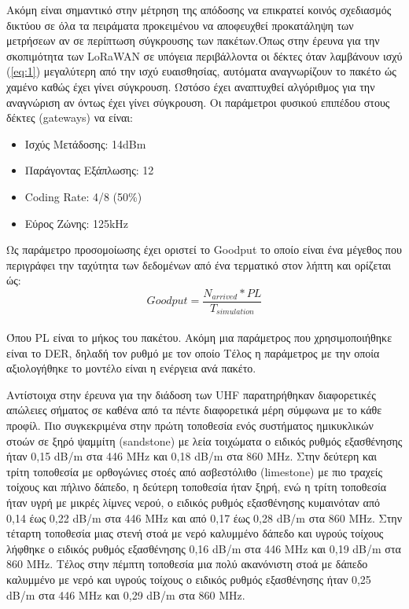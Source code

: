 \documentclass[12pt, greek]{article}
\begin{document}
\begin{multicols*}{2}
        Ακόμη είναι σημαντικό στην μέτρηση της απόδοσης να επικρατεί κοινός
        σχεδιασμός δικτύου σε όλα τα πειράματα προκειμένου να αποφευχθεί προκατάληψη
        των μετρήσεων αν σε περίπτωση σύγκρουσης των πακέτων.Όπως στην έρευνα για την
        σκοπιμότητα των LoRaWAN σε υπόγεια περιβάλλοντα \cite{zhao_feasibility_2023}
        οι δέκτες όταν λαμβάνουν ισχύ (\ref{eq:1}) μεγαλύτερη από την ισχύ ευαισθησίας,
        αυτόματα αναγνωρίζουν το πακέτο ώς χαμένο καθώς έχει γίνει σύγκρουση. Ωστόσο έχει
        αναπτυχθεί αλγόριθμος για την αναγνώριση αν όντως έχει γίνει σύγκρουση.
        Οι παράμετροι φυσικού επιπέδου στους δέκτες (gateways) να είναι:
        \begin{itemize}
            \item Ισχύς Μετάδοσης: 14dBm
            \item Παράγοντας Εξάπλωσης: 12
            \item Coding Rate: 4/8 (50\%)
            \item Εύρος Ζώνης: 125kHz
        \end{itemize}

        Ως παράμετρο προσομοίωσης έχει οριστεί το Goodput το οποίο είναι ένα μέγεθος
        που περιγράφει την ταχύτητα των δεδομένων από ένα τερματικό στον λήπτη και 
        ορίζεται ώς: 
        \begin{equation}\label{eq:2}
            Goodput = \frac{N_{arrived} * PL}{T_{simulation}}
        \end{equation}\\
        Όπου PL είναι το μήκος του πακέτου.
        Ακόμη μια παράμετρος που χρησιμοποιήθηκε είναι το DER, δηλαδή τον ρυθμό με τον οποίο 
        Τέλος η παράμετρος με την οποία αξιολογήθηκε το μοντέλο είναι η ενέργεια ανά πακέτο. 

        Αντίστοιχα στην έρευνα για την διάδοση των UHF \cite{rak_uhf_2007} παρατηρήθηκαν
        διαφορετικές απώλειες σήματος σε καθένα από τα πέντε διαφορετικά μέρη σύμφωνα με το
        κάθε προφίλ. Πιο συγκεκριμένα στην πρώτη τοποθεσία ενός συστήματος ημικυκλικών στοών
        σε ξηρό ψαμμίτη (sandstone) με λεία τοιχώματα ο ειδικός ρυθμός εξασθένησης ήταν
        0,15 dB/m στα 446 MHz και 0,18 dB/m στα 860 MHz.
        Στην δεύτερη και τρίτη τοποθεσία με ορθογώνιες στοές από ασβεστόλιθο (limestone) με πιο
        τραχείς τοίχους και πήλινο δάπεδο, η δεύτερη τοποθεσία ήταν ξηρή, ενώ η τρίτη τοποθεσία
        ήταν υγρή με μικρές λίμνες νερού, ο ειδικός ρυθμός εξασθένησης κυμαινόταν από 0,14 έως
        0,22 dB/m στα 446 MHz και από 0,17 έως 0,28 dB/m στα 860 MHz. Στην τέταρτη τοποθεσία
        μιας στενή στοά με νερό καλυμμένο δάπεδο και υγρούς τοίχους λήφθηκε ο ειδικός ρυθμός
        εξασθένησης 0,16 dB/m στα 446 MHz και 0,19 dB/m στα 860 MHz. Τέλος στην πέμπτη τοποθεσία
        μια πολύ ακανόνιστη στοά με δάπεδο καλυμμένο με νερό και υγρούς τοίχους ο ειδικός ρυθμός
        εξασθένησης ήταν 0,25 dB/m στα 446 MHz και 0,29 dB/m στα 860 MHz.


\end{multicols*}
\end{document}
